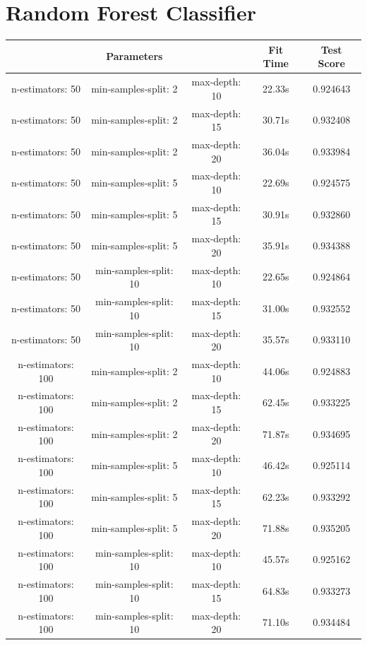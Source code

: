 \documentclass{article}
\begin{document}
\section{Random Forest Classifier}
\begin{tabular}{|c c c | c c|}
& Parameters & & Fit Time & Test Score \\ [0.5ex] 
\hline
n-estimators: 50 & min-samples-split: 2 & max-depth: 10 & 22.33s & 0.924643 \\
n-estimators: 50 & min-samples-split: 2 & max-depth: 15 & 30.71s & 0.932408 \\
n-estimators: 50 & min-samples-split: 2 & max-depth: 20 & 36.04s & 0.933984 \\ 
\hline
n-estimators: 50 & min-samples-split: 5 & max-depth: 10 & 22.69s & 0.924575 \\
n-estimators: 50 & min-samples-split: 5 & max-depth: 15 & 30.91s & 0.932860 \\
\rowcolor{LightYellow}
n-estimators: 50 & min-samples-split: 5 & max-depth: 20 & 35.91s & 0.934388 \\ 
\hline
n-estimators: 50 & min-samples-split: 10 & max-depth: 10 & 22.65s & 0.924864 \\
n-estimators: 50 & min-samples-split: 10 & max-depth: 15 & 31.00s & 0.932552 \\
n-estimators: 50 & min-samples-split: 10 & max-depth: 20 & 35.57s & 0.933110 \\ 
\hline
\hline
n-estimators: 100 & min-samples-split: 2 & max-depth: 10 & 44.06s & 0.924883 \\
n-estimators: 100 & min-samples-split: 2 & max-depth: 15 & 62.45s & 0.933225 \\
n-estimators: 100 & min-samples-split: 2 & max-depth: 20 & 71.87s & 0.934695 \\ 
\hline
n-estimators: 100 & min-samples-split: 5 & max-depth: 10 & 46.42s & 0.925114 \\
n-estimators: 100 & min-samples-split: 5 & max-depth: 15 & 62.23s & 0.933292 \\
\rowcolor{LightYellow}
n-estimators: 100 & min-samples-split: 5 & max-depth: 20 & 71.88s & 0.935205 \\ 
\hline
n-estimators: 100 & min-samples-split: 10 & max-depth: 10 & 45.57s & 0.925162 \\
n-estimators: 100 & min-samples-split: 10 & max-depth: 15 & 64.83s & 0.933273 \\
n-estimators: 100 & min-samples-split: 10 & max-depth: 20 & 71.10s & 0.934484 \\
\hline
\end{tabular}
\end{document}
